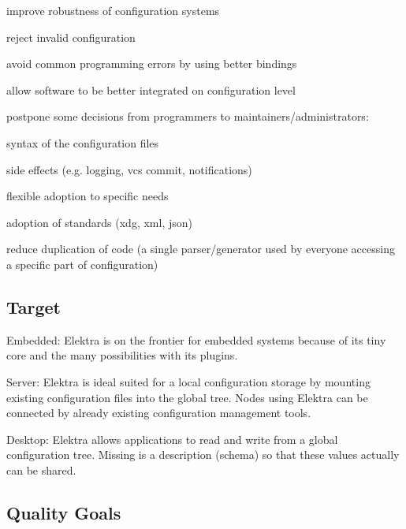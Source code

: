 
\begin{DoxyItemize}
\item improve robustness of configuration systems
\begin{DoxyItemize}
\item reject invalid configuration
\item avoid common programming errors by using better bindings
\end{DoxyItemize}
\item allow software to be better integrated on configuration level
\item postpone some decisions from programmers to maintainers/administrators\+:
\begin{DoxyItemize}
\item syntax of the configuration files
\item side effects (e.\+g. logging, vcs commit, notifications)
\item flexible adoption to specific needs
\item adoption of standards (xdg, xml, json)
\end{DoxyItemize}
\item reduce duplication of code (a single parser/generator used by everyone accessing a specific part of configuration)
\end{DoxyItemize}

\subsection*{Target}


\begin{DoxyItemize}
\item Embedded\+: Elektra is on the frontier for embedded systems because of its tiny core and the many possibilities with its plugins.
\item Server\+: Elektra is ideal suited for a local configuration storage by mounting existing configuration files into the global tree. Nodes using Elektra can be connected by already existing configuration management tools.
\item Desktop\+: Elektra allows applications to read and write from a global configuration tree. Missing is a description (schema) so that these values actually can be shared.
\end{DoxyItemize}

\subsection*{Quality Goals}


